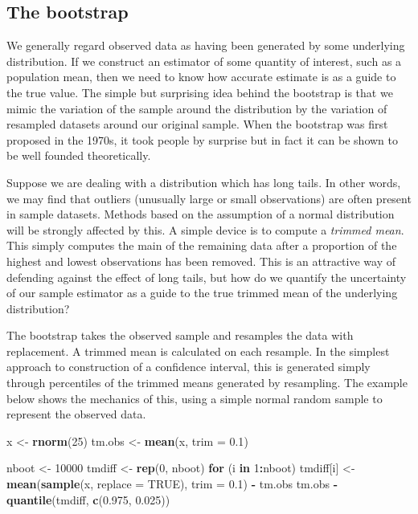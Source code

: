 \documentclass[
]{book}
\newenvironment{Shaded}{\begin{snugshade}}{\end{snugshade}}
\newcommand{\AttributeTok}[1]{\textcolor[rgb]{0.13,0.29,0.53}{#1}}
\newcommand{\ConstantTok}[1]{\textcolor[rgb]{0.56,0.35,0.01}{#1}}
\newcommand{\ControlFlowTok}[1]{\textcolor[rgb]{0.13,0.29,0.53}{\textbf{#1}}}
\newcommand{\DecValTok}[1]{\textcolor[rgb]{0.00,0.00,0.81}{#1}}
\newcommand{\FloatTok}[1]{\textcolor[rgb]{0.00,0.00,0.81}{#1}}
\newcommand{\FunctionTok}[1]{\textcolor[rgb]{0.13,0.29,0.53}{\textbf{#1}}}
\newcommand{\NormalTok}[1]{#1}
\newcommand{\OtherTok}[1]{\textcolor[rgb]{0.56,0.35,0.01}{#1}}
\newcommand{\SpecialCharTok}[1]{\textcolor[rgb]{0.81,0.36,0.00}{\textbf{#1}}}
\begin{document}
\subsection{The bootstrap}\label{the-bootstrap}

We generally regard observed data as having been generated by some underlying distribution. If we construct an estimator of some quantity of interest, such as a population mean, then we need to know how accurate estimate is as a guide to the true value. The simple but surprising idea behind the bootstrap is that we mimic the variation of the sample around the distribution by the variation of resampled datasets around our original sample. When the bootstrap was first proposed in the 1970s, it took people by surprise but in fact it can be shown to be well founded theoretically.

Suppose we are dealing with a distribution which has long tails. In other words, we may find that outliers (unusually large or small observations) are often present in sample datasets. Methods based on the assumption of a normal distribution will be strongly affected by this. A simple device is to compute a \emph{trimmed mean}. This simply computes the main of the remaining data after a proportion of the highest and lowest observations has been removed. This is an attractive way of defending against the effect of long tails, but how do we quantify the uncertainty of our sample estimator as a guide to the true trimmed mean of the underlying distribution?

The bootstrap takes the observed sample and resamples the data with replacement. A trimmed mean is calculated on each resample. In the simplest approach to construction of a confidence interval, this is generated simply through percentiles of the trimmed means generated by resampling. The example below shows the mechanics of this, using a simple normal random sample to represent the observed data.

\begin{Shaded}
\begin{Highlighting}[]
\NormalTok{x      }\OtherTok{\textless{}{-}} \FunctionTok{rnorm}\NormalTok{(}\DecValTok{25}\NormalTok{)}
\NormalTok{tm.obs }\OtherTok{\textless{}{-}} \FunctionTok{mean}\NormalTok{(x, }\AttributeTok{trim =} \FloatTok{0.1}\NormalTok{)}

\NormalTok{nboot  }\OtherTok{\textless{}{-}} \DecValTok{10000}
\NormalTok{tmdiff }\OtherTok{\textless{}{-}} \FunctionTok{rep}\NormalTok{(}\DecValTok{0}\NormalTok{, nboot)}
\ControlFlowTok{for}\NormalTok{ (i }\ControlFlowTok{in} \DecValTok{1}\SpecialCharTok{:}\NormalTok{nboot)}
\NormalTok{   tmdiff[i] }\OtherTok{\textless{}{-}} \FunctionTok{mean}\NormalTok{(}\FunctionTok{sample}\NormalTok{(x, }\AttributeTok{replace =} \ConstantTok{TRUE}\NormalTok{), }\AttributeTok{trim =} \FloatTok{0.1}\NormalTok{) }\SpecialCharTok{{-}}\NormalTok{ tm.obs}
\NormalTok{tm.obs }\SpecialCharTok{{-}} \FunctionTok{quantile}\NormalTok{(tmdiff, }\FunctionTok{c}\NormalTok{(}\FloatTok{0.975}\NormalTok{, }\FloatTok{0.025}\NormalTok{))}
\end{Highlighting}
\end{Shaded}
\end{document}
